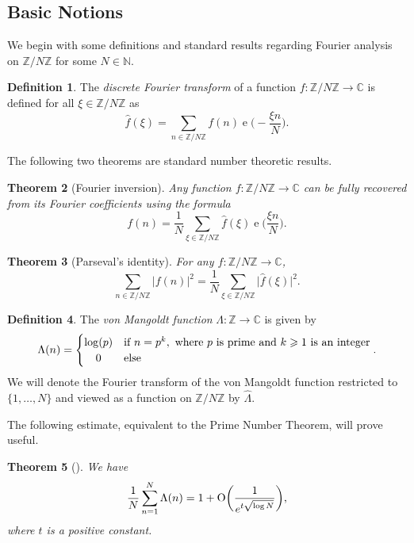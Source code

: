 \documentclass[letterpaper, 12pt]{article}
\theoremstyle{plain}
\newtheorem{Theorem}{Theorem}
\theoremstyle{definition}
\newtheorem{Definition}[Theorem]{Definition}
\theoremstyle{plain}
\theoremstyle{plain}
\numberwithin{equation}{section}
\newcommand{\Oh}{{\rm O}}
\newcommand{\Z}{\mathbb{Z}}
\newcommand{\C}{\mathbb{C}}
\newcommand{\define}[1]{{\itshape #1}}
\renewcommand{\geq}{\geqslant}
\newcommand{\1}{\textbf{1}}
\DeclareMathOperator{\e}{e}
\begin{document}
\subsection{Basic Notions}

We begin with some definitions and standard results regarding Fourier analysis on $\Z/N\Z$ for some $N \in \mathbb{N}$. 

\begin{Definition}
    The \define{discrete Fourier transform} of a function $f \colon \Z/N\Z \to \C$ is defined for all $\xi \in \Z/N\Z$ as
    \[
        \hat{f}(\xi) = \sum_{n \in \Z/N\Z} f(n) \e\biggl(\! -\frac{\xi n}{N} \biggr).
    \]
\end{Definition}

The following two theorems are standard number theoretic results.

\begin{Theorem}[Fourier inversion]\label{thm:fourier}
    Any function $f \colon \Z/N\Z \to \C$ can be fully recovered from its Fourier coefficients using the formula
    \[
        f(n)=\frac{1}{N}\sum_{\xi \in \mathbb{Z}/N\mathbb{Z}} \hat{f}(\xi) \e\biggl(\frac{\xi n}{N}\biggr).
    \]
\end{Theorem}

\begin{Theorem}[Parseval's identity]\label{thm:parseval}
    For any $f \colon \Z/N\Z \to\C$,
    \[
        \sum_{n \in \Z/N\Z} \lvert f(n) \rvert^2 = \frac{1}{N} \sum_{\xi \in \Z/N\Z} \bigl\lvert \hat{f}(\xi) \bigr\rvert^2.
    \]
\end{Theorem}

\begin{Definition}\label{def:von-mangoldt}
    The \define{von Mangoldt function} \(\Lambda \colon \Z \to \C\) is given by
    \[
        \Lambda(n) =
        \begin{cases}
            \log(p) &\text{if } n = p^k, \text{ where } p \text{ is prime and } k \geq 1 \text{ is an integer}\\
            \hfil 0 &\text{else}
        \end{cases}.
    \]
    We will denote the Fourier transform of the von Mangoldt function restricted to \(\{1, \ldots, N\}\) and viewed as a function on \(\Z/N\Z\) by \(\hat{\Lambda}\).
\end{Definition}

The following estimate, equivalent to the Prime Number Theorem, will prove useful.
\begin{Theorem}[]\label{thm:prime-number-equiv}
   We have
    \[
        \frac{1}{N} \sum_{n = 1}^{N} \Lambda(n) = 1 + \Oh \biggl(\frac{1}{e^{t \sqrt{\log N}}} \biggr),
    \]
    where $t$ is a positive constant.
\end{Theorem}
\end{document}
